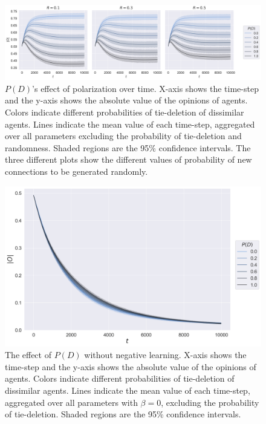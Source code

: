 \documentclass{article}
\begin{document}
\begin{figure}[H]
    \centering
    \includegraphics[width=.8\linewidth]{../plots/overall/Absolute_Opinion_Tie_Dissolution.png}
  \caption{$P(D)$'s effect of polarization over time. X-axis shows the time-step and the y-axis shows the absolute value of the opinions of agents. Colors indicate different probabilities of tie-deletion of dissimilar agents. Lines indicate the mean value of each time-step, aggregated over all parameters excluding the probability of tie-deletion and randomness. Shaded regions are the 95\% confidence intervals. The three different plots show the different values of probability of new connections to be generated randomly. }
  \label{fig:sfig1}
\end{figure}

\begin{figure}[H]
    \centering
    \includegraphics[width=.8\linewidth]{../plots/overall/Absolute_Opinion_Tie_Deletion_Without_Negative.png}
  \caption{The effect of $P(D)$ without negative learning. X-axis shows the time-step and the y-axis shows the absolute value of the opinions of agents. Colors indicate different probabilities of tie-deletion of dissimilar agents. Lines indicate the mean value of each time-step, aggregated over all parameters with $\beta = 0$, excluding the probability of tie-deletion. Shaded regions are the 95\% confidence intervals.}
  \label{fig:sfig1}
\end{figure}
\end{document}
